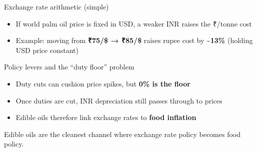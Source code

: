 \documentclass[
  ignorenonframetext,
  aspectratio=169,
]{beamer}
\makeatletter
\providecommand{\tightlist}{%
  \setlength{\itemsep}{0pt}\setlength{\parskip}{0pt}}
\let\quarto@originallabel\label
\DeclareRobustCommand*{\label}[1]{\quarto@originallabel{#1}}
\makeatother
\begin{document}
\begin{frame}{Exchange rate arithmetic (simple)}
\label{exchange-rate-arithmetic-simple}
\begin{itemize}
\tightlist
\item
  If world palm oil price is fixed in USD, a weaker INR raises the
  ₹/tonne cost
\item
  Example: moving from \textbf{₹75/\$ → ₹85/\$} raises rupee cost by
  \textasciitilde{}\textbf{13\%} (holding USD price constant)
\end{itemize}
\end{frame}

\begin{frame}{Policy levers and the ``duty floor'' problem}
\label{policy-levers-and-the-duty-floor-problem}
\begin{itemize}
\tightlist
\item
  Duty cuts can cushion price spikes, but \textbf{0\% is the floor}
\item
  Once duties are cut, INR depreciation still passes through to prices
\item
  Edible oils therefore link exchange rates to \textbf{food inflation}
\end{itemize}

Edible oils are the cleanest channel where exchange rate policy becomes
food policy.
\end{frame}
\end{document}
